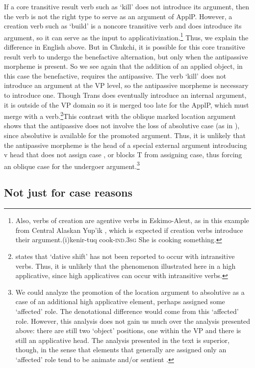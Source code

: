 \documentclass[output=paper,colorlinks,citecolor=brown,nonflat]{./langscibook}
\begin{document}
If a core transitive result verb such as ‘kill’ does not introduce its argument, then the verb is not the right type to serve as an argument of ApplP. However, a creation verb such as ‘build’ is a noncore transitive verb and does introduce its argument, so it can serve as the input to applicativization.\footnote{Also, verbs of creation are agentive verbs in Eskimo-Aleut, as in this example from Central Alaskan Yup’ik \citep{Miyaoka2012}, which is expected if creation verbs introduce their argument.(i)kenir-tuq      cook-\textsc{ind.3sg} She is cooking something.}  Thus, we explain the difference in English above. But in Chukchi, it is possible for this core transitive result verb to undergo the benefactive alternation, but only when the antipassive morpheme is present. So we see again that the addition of an applied object, in this case the benefactive, requires the antipassive. The verb ‘kill’ does not introduce an argument at the VP level, so the antipassive morpheme is necessary to introduce one. Though Trans does eventually introduce an internal argument, it is outside of the VP domain so it is merged too late for the ApplP, which must merge with a verb.\footnote{\citet{Spencer1995} states that ‘dative shift’ has not been reported to occur with intransitive verbs. Thus, it is unlikely that the phenomenon illustrated here in a high applicative, since high applicatives can occur with intransitive verbs.}This contrast with the oblique marked location argument shows that the antipassive does not involve the loss of absolutive case (as in \citealt{Baker1988}), since absolutive is available for the promoted argument. Thus, it is unlikely that the antipassive morpheme is the head of a special external argument introducing v head that does not assign case \citep{Levin2015}, or blocks T from assigning case, thus forcing an oblique case for the undergoer argument.\footnote{We could analyze the promotion of the location argument to absolutive as a case of an additional high applicative element, perhaps assigned some ‘affected’ role. The denotational difference would come from this ‘affected’ role. However, this analysis does not gain us much over the analysis presented above: there are still two ‘object’ positions, one within the VP and there is still an applicative head. The analysis presented in the text is superior, though, in the sense that elements that generally are assigned only an ‘affected’ role tend to be animate and/or sentient \citep{BosseEtAl2012}.} 

\subsection{Not just for case reasons} %
\end{document}
